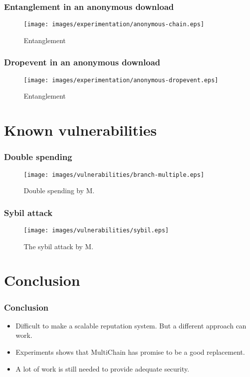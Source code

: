 \documentclass{beamer}
\begin{document}
\begin{frame}
\frametitle{Entanglement in an anonymous download}
\begin{figure}
    \centering
        \texttt{[image: images/experimentation/anonymous-chain.eps]}
    \caption{Entanglement}
\end{figure}
\end{frame}

\begin{frame}
\frametitle{Dropevent in an anonymous download}
\begin{figure}
    \centering
        \texttt{[image: images/experimentation/anonymous-dropevent.eps]}
    \caption{Entanglement}
\end{figure}
\end{frame}


\section{Known vulnerabilities}

\begin{frame}
\frametitle{Double spending}
\begin{figure}
	\centerline{\texttt{[image: images/vulnerabilities/branch-multiple.eps]}}
	\caption{Double spending by M.}
\end{figure}
\end{frame}

\begin{frame}
\frametitle{Sybil attack}
\begin{figure}
	\centerline{\texttt{[image: images/vulnerabilities/sybil.eps]}}
	\caption{The sybil attack by M.}
	\end{figure}
\end{frame}

\section{Conclusion}

\begin{frame}
\frametitle{Conclusion}
\begin{itemize}
\pause \item{Difficult to make a scalable reputation system. But a different approach can work.}
\pause \item{Experiments shows that MultiChain has promise to be a good replacement.}
\pause \item{A lot of work is still needed to provide adequate security.}
\end{itemize}
\end{frame}
\end{document}
